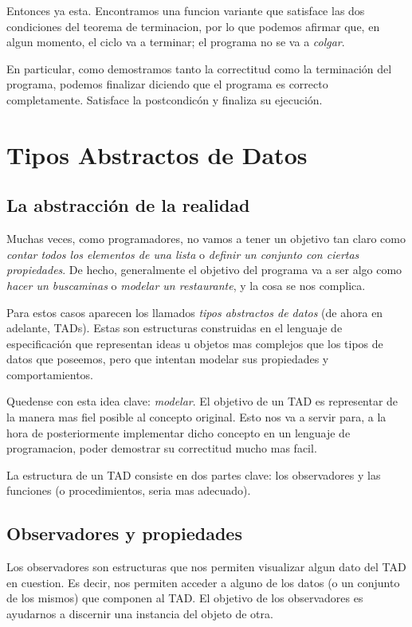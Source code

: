 \documentclass{article}
\begin{document}
Entonces ya esta. Encontramos una funcion variante que satisface las dos condiciones del teorema de terminacion, por lo que podemos afirmar que, en algun momento, el ciclo va a terminar; el programa no se va a \textit{colgar}.

En particular, como demostramos tanto la correctitud como la terminación del programa, podemos finalizar diciendo que el programa es correcto completamente. Satisface la postcondicón y finaliza su ejecución.

\newpage
\section{Tipos Abstractos de Datos}

\subsection{La abstracción de la realidad}

Muchas veces, como programadores, no vamos a tener un objetivo tan claro como \textit{contar todos los elementos de una lista} o \textit{definir un conjunto con ciertas propiedades}. De hecho, generalmente el objetivo del programa va a ser algo como \textit{hacer un buscaminas} o \textit{modelar un restaurante}, y la cosa se nos complica.

Para estos casos aparecen los llamados \textit{tipos abstractos de datos} (de ahora en adelante, TADs). Estas son estructuras construidas en el lenguaje de especificación que representan ideas u objetos mas complejos que los tipos de datos que poseemos, pero que intentan modelar sus propiedades y comportamientos.

Quedense con esta idea clave: \textit{modelar}. El objetivo de un TAD es representar de la manera mas fiel posible al concepto original. Esto nos va a servir para, a la hora de posteriormente implementar dicho concepto en un lenguaje de programacion, poder demostrar su correctitud mucho mas facil.

La estructura de un TAD consiste en dos partes clave: los observadores y las funciones (o procedimientos, seria mas adecuado).

\subsection{Observadores y propiedades}

Los observadores son estructuras que nos permiten visualizar algun dato del TAD en cuestion. Es decir, nos permiten acceder a alguno de los datos (o un conjunto de los mismos) que componen al TAD. El objetivo de los observadores es ayudarnos a discernir una instancia del objeto de otra.
\end{document}
